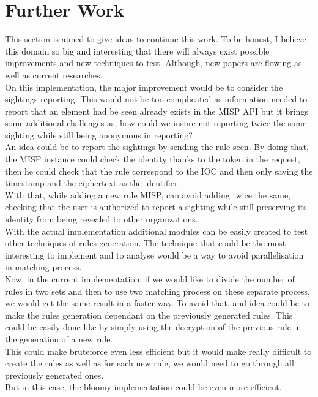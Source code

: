 \documentclass{eplmastersthesis}
\begin{document}
\section{Further Work}
This section is aimed to give ideas to continue this work. To be honest, I believe this domain so big and interesting that there will always exist possible improvements and new techniques to test. Although, new papers are flowing as well as current researches.\\
On this implementation, the major improvement would be to consider the sightings reporting. This would not be too complicated as information needed to report that an element had be seen already exists in the MISP API but it brings some additional challenges as, how could we insure not reporting twice the same sighting while still being anonymous in reporting?\\
An idea could be to report the sightings by sending the rule seen. By doing that, the MISP instance could check the identity thanks to the token in the request, then he could check that the rule correspond to the IOC and then only saving the timestamp and the ciphertext as the identifier.\\
With that, while adding a new rule MISP, can avoid adding twice the same, checking that the user is authorized to report a sighting while still preserving its identity from being revealed to other organizations.\\

With the actual implementation additional modules can be easily created to test other techniques of rules generation. The technique that could be the most interesting to implement and to analyse would be a way to avoid parallelisation in matching process. \\
Now, in the current implementation, if we would like to divide the number of rules in two sets and then to use two matching process on these separate process, we would get the same result in a faster way. To avoid that, and idea could be to make the rules generation dependant on the previously generated rules. This could be easily done like by simply using the decryption of the previous rule in the generation of a new rule.\\
This could make bruteforce even less efficient but it would make really difficult to create the rules as well as for each new rule, we would need to go through all previously generated ones.\\
But in this case, the bloomy implementation could be even more efficient.\\
\end{document}
